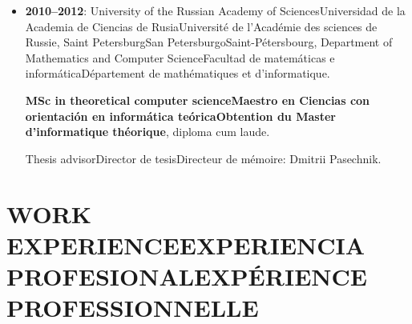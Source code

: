 \documentclass{article}
\newcommand{\biling}[3]{\ifdefined\english#1\fi\ifdefined\spanish#2\fi\ifdefined\french#3\fi}
\begin{document}
\begin{itemize}
  \biling{ALGANT Master Program}{Programa ALGANT Master}{Programme ALGANT Master}, \biling{European Union scholarship}{beca de la Unión Europea}{Bourse de l'Union européenne}.

  \textbf{\biling{MSc in Mathematics}{Maestro en Ciencias con orientación en matemáticas}{Obtention du Master de mathématique}}.

  \biling{MSc thesis}{Tesis de maestría}{Mémoire}
  \biling{on algebraic K theory}{sobre la teoría K algebraica}{sur la K-théorie algébrique},
  \biling{supervised by}{dirigida por}{dirigé par} Boas Erez (\biling{Bordeaux}{Burdeos}{Bordeaux}).

\item \textbf{2010--2012}: \biling{University of the Russian Academy of Sciences}{Universidad de la Academia de Ciencias de Rusia}{Université de l'Académie des sciences de Russie},
  \biling{Saint Petersburg}{San Petersburgo}{Saint-Pétersbourg}, \biling{Department of Mathematics and Computer Science}{Facultad de matemáticas e informática}{Département de mathématiques et d'informatique}.

  \textbf{\biling{MSc in theoretical computer science}{Maestro en Ciencias con orientación en informática teórica}{Obtention du Master d'informatique théorique}},
  diploma cum laude.

  \biling{Thesis advisor}{Director de tesis}{Directeur de mémoire}: Dmitrii Pasechnik.

  \iffalse
\item \textbf{2006--2010}: \biling{Lipetsk State University}{Universidad Estatal de Lipetsk}, \biling{Russia}{Rusia}.

  \textbf{\biling{BSc in computer science and software engineering}{Licenciado en ciencias de computación y programación}},
  diploma cum laude.
  \fi

\end{itemize}

\pagebreak

{\color{RoyalBlue}\section*{\biling{WORK EXPERIENCE}{EXPERIENCIA PROFESIONAL}{EXPÉRIENCE PROFESSIONNELLE}}}
\end{document}
